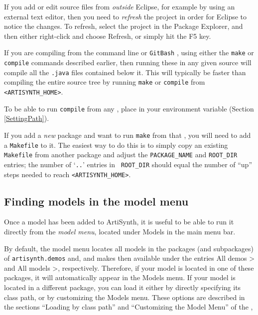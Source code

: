 \begin{sideblock}
If you add or edit source files from {\it outside} Eclipse, for
example by using an external text editor, then you need to {\it
refresh} the project in order for Eclipse to notice the changes.  To
refresh, select the project in the Package Explorer, and then either
right-click and choose {\sf Refresh}, or simply hit the {\sf F5} key.
\end{sideblock}

If you are compiling from the command line 
\ifWindows
or {\tt GitBash}%
\fi
, using either the {\tt make} or {\tt compile} commands described
earlier, then running these in any given source \directory{}
will compile all the {\tt .java} files contained below it. This will
typically be faster than compiling the entire source tree by running
{\tt make} or {\tt compile} from {\tt <ARTISYNTH\_HOME>}.

\begin{sideblock}
To be able to run {\tt compile} from any \directory{},
place  in your \PATH{} environment variable
(Section \ref{SettingPath}).
\end{sideblock}

\begin{sideblock}
If you add a {\it new} package \directory{} and want to run {\tt make}
from that \directory{}, you will need to add a {\tt Makefile} to
it. The easiest way to do this is to simply copy an existing {\tt
Makefile} from another package and adjust the {\tt PACKAGE\_NAME} and
{\tt ROOT\_DIR} entries; the number of `{\tt ..}'  entries in {\tt
ROOT\_DIR} should equal the number of ``up'' steps needed to reach
{\tt <ARTISYNTH\_HOME>}.
\end{sideblock}

\subsection{Finding models in the model menu}

Once a model has been added to ArtiSynth, it is useful to be able to
run it directly from the {\it model menu}, located under {\sf Models}
in the main menu bar.

By default, the model menu locates all models in the packages
(and subpackages) of {\tt artisynth.demos} and, and makes then available under the entries {\sf All
demos >} and {\sf All models >}, respectively. Therefore, if your
model is located in one of these packages, it will automatically
appear in the {\sf Models} menu. If your model is located in a
different package, you can load it either by directly specifying its
class path, or by customizing the {\sf Models} menu.  These options
are described in the sections ``Loading by class path'' and
``Customizing the Model Menu'' of the
,

